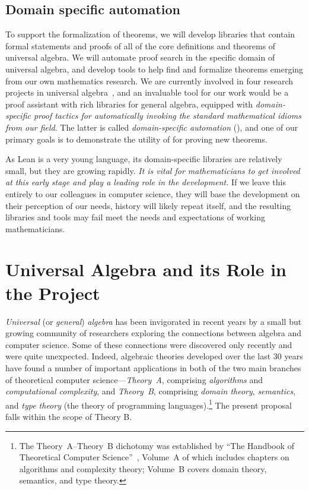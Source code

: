 \documentclass[11pt]{amsart}  %
\begin{document}
\subsection{Domain specific automation}
To support the formalization of theorems, we will develop libraries that contain formal statements and proofs of all of the core definitions and theorems of universal algebra. We will automate proof search in the specific domain of universal algebra, and develop tools to help find and formalize theorems emerging from our own mathematics research. 
We are currently involved in four research projects in universal algebra~\cite{Bergman-DeMeo:2016,fin-lat-rep,DFV:2018,fg-free-lat}, and an invaluable tool for our work would be a proof assistant with rich libraries for general algebra, equipped with \emph{domain-specific proof tactics for automatically invoking the standard mathematical idioms from our field}. The latter is called \emph{domain-specific automation} (\dsa), and one of our primary goals is to demonstrate the utility of \dsa for proving new theorems.

As Lean is a very young language, its domain-specific libraries are relatively small, but they are growing rapidly. \emph{It is vital for mathematicians to get involved at this early stage and play a leading role in the development.}  If we leave this entirely to our colleagues in computer science, they will base the development on their perception of our needs, history will likely repeat itself, and the resulting libraries and tools may fail meet the needs and expectations of working mathematicians.





\section{Universal Algebra and its Role in the Project}
\emph{Universal} (or \emph{general}) \emph{algebra} has been invigorated in recent years by a small but growing community of researchers exploring the connections between algebra and computer science. Some of these connections were discovered only recently and were quite unexpected. Indeed, algebraic theories developed over the last 30 years have found a number of important applications in both of the two main branches of theoretical computer science---\emph{Theory~A}, comprising \emph{algorithms} and \emph{computational complexity}, and \emph{Theory~B}, comprising \emph{domain theory}, \emph{semantics}, and \emph{type theory} (the theory of programming languages).\footnote{The Theory~A--Theory~B dichotomy was established by ``The Handbook of Theoretical Computer Science''~\cite{vanLeeuwen:1991A,vanLeeuwen:1991B}, Volume~A of which includes chapters on algorithms and complexity theory; Volume~B covers domain theory, semantics, and type theory.}
The present proposal falls within the scope of Theory B.
\end{document}

